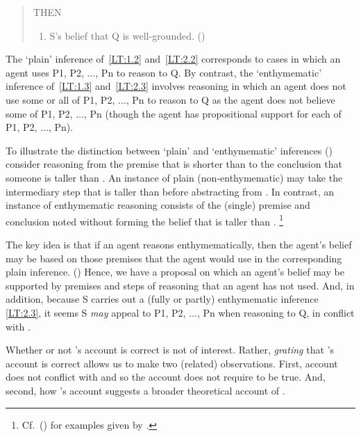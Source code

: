 \begin{note}
\begin{quote}
    THEN
    \begin{enumerate}[label=(3)]
    \item S's belief that Q is well-grounded.\nolinebreak
      \mbox{}\hfill\mbox{(\citeyear[87]{Moretti:2019wx})}
    \end{enumerate}
  \end{quote}

  The `plain' inference of~\ref{LT:1.2} and~\ref{LT:2.2} corresponds to cases in which an agent uses P1, P2, \(\dots\), Pn to reason to Q.
  By contrast, the `enthymematic' inference of~\ref{LT:1.3} and~\ref{LT:2.3} involves reasoning in which an agent does not use some or all of P1, P2, \(\dots\), Pn to reason to Q as the agent does not believe some of P1, P2, \(\dots\), Pn (though the agent has propositional support for each of P1, P2, \(\dots\), Pn).

  To illustrate the distinction between `plain' and `enthymematic' inferences (\citeyear[Cf.][85]{Moretti:2019wx}) consider reasoning from the premise that  is shorter than  to the conclusion that someone is taller than .
  An instance of plain (non-enthymematic) may take the intermediary step that  is taller than  before abstracting from .
  In contrast, an instance of enthymematic reasoning consists of the (single) premise and conclusion noted without forming the belief that  is taller than .\nolinebreak
  \footnote{Cf.\ (\citeyear[87--89]{Moretti:2019wx}) for examples given by \citeauthor{Moretti:2019wx}.}

  The key idea is that if an agent reasons enthymematically, then the agent's belief may be based on those premises that the agent would use in the corresponding plain inference.
  (\citeyear[Cf.][86--87]{Moretti:2019wx})
  Hence, we have a proposal on which an agent's belief may be supported by premises and steps of reasoning that an agent has not used.
  And, in addition, because S carries out a (fully or partly) enthymematic inference \ref{LT:2.3}, it seems S \emph{may} appeal to P1, P2, \(\dots\), Pn when reasoning to Q, in conflict with \ESU{}.

  Whether or not \citeauthor{Moretti:2019wx}'s account is correct is not of interest.
  Rather, \emph{grating} that \citeauthor{Moretti:2019wx}'s account is correct allows us to make two (related) observations.
  First, \citeauthor{Moretti:2019wx} account does not conflict with \ESU{} and so the account does not require \EAS{} to be true.
  And, second, how \citeauthor{Moretti:2019wx}'s account suggests a broader theoretical account of \EAS{}.
\end{note}

